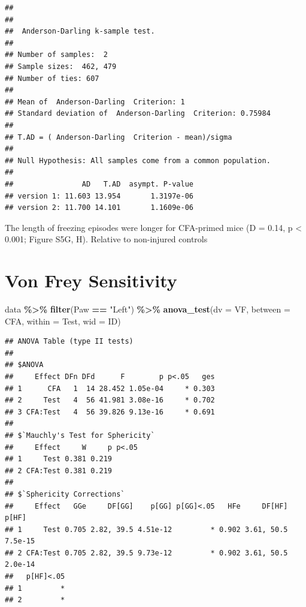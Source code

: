 \documentclass[
]{book}
\newenvironment{Shaded}{\begin{snugshade}}{\end{snugshade}}
\newcommand{\AttributeTok}[1]{\textcolor[rgb]{0.13,0.29,0.53}{#1}}
\newcommand{\FunctionTok}[1]{\textcolor[rgb]{0.13,0.29,0.53}{\textbf{#1}}}
\newcommand{\NormalTok}[1]{#1}
\newcommand{\SpecialCharTok}[1]{\textcolor[rgb]{0.81,0.36,0.00}{\textbf{#1}}}
\newcommand{\StringTok}[1]{\textcolor[rgb]{0.31,0.60,0.02}{#1}}
\begin{document}
\begin{verbatim}
## 
## 
##  Anderson-Darling k-sample test.
## 
## Number of samples:  2
## Sample sizes:  462, 479
## Number of ties: 607
## 
## Mean of  Anderson-Darling  Criterion: 1
## Standard deviation of  Anderson-Darling  Criterion: 0.75984
## 
## T.AD = ( Anderson-Darling  Criterion - mean)/sigma
## 
## Null Hypothesis: All samples come from a common population.
## 
##                AD   T.AD  asympt. P-value
## version 1: 11.603 13.954       1.3197e-06
## version 2: 11.700 14.101       1.1609e-06
\end{verbatim}

The length of freezing episodes were longer for CFA-primed mice (D = 0.14, p \textless{} 0.001; Figure S5G, H). Relative to non-injured controls

\section*{Von Frey Sensitivity}\label{von-frey-sensitivity}

\begin{Shaded}
\begin{Highlighting}[]
\NormalTok{data }\SpecialCharTok{\%\textgreater{}\%}
  \FunctionTok{filter}\NormalTok{(Paw }\SpecialCharTok{==} \StringTok{"Left"}\NormalTok{) }\SpecialCharTok{\%\textgreater{}\%}
  \FunctionTok{anova\_test}\NormalTok{(}\AttributeTok{dv =}\NormalTok{ VF, }\AttributeTok{between =}\NormalTok{ CFA, }\AttributeTok{within =}\NormalTok{ Test, }\AttributeTok{wid =}\NormalTok{ ID)}
\end{Highlighting}
\end{Shaded}

\begin{verbatim}
## ANOVA Table (type II tests)
## 
## $ANOVA
##     Effect DFn DFd      F        p p<.05   ges
## 1      CFA   1  14 28.452 1.05e-04     * 0.303
## 2     Test   4  56 41.981 3.08e-16     * 0.702
## 3 CFA:Test   4  56 39.826 9.13e-16     * 0.691
## 
## $`Mauchly's Test for Sphericity`
##     Effect     W     p p<.05
## 1     Test 0.381 0.219      
## 2 CFA:Test 0.381 0.219      
## 
## $`Sphericity Corrections`
##     Effect   GGe     DF[GG]    p[GG] p[GG]<.05   HFe     DF[HF]   p[HF]
## 1     Test 0.705 2.82, 39.5 4.51e-12         * 0.902 3.61, 50.5 7.5e-15
## 2 CFA:Test 0.705 2.82, 39.5 9.73e-12         * 0.902 3.61, 50.5 2.0e-14
##   p[HF]<.05
## 1         *
## 2         *
\end{verbatim}
\end{document}
